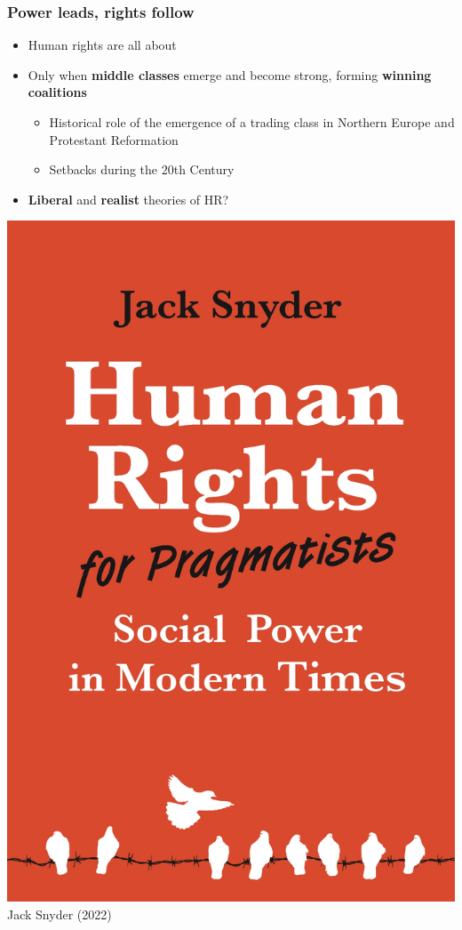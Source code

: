 \documentclass[aspectratio=43]{beamer}
\begin{document}
\begin{frame}
\frametitle{Power leads, rights follow}
\centering

\begin{minipage}{.59\textwidth}\centering

\begin{itemize}
  \item Human rights are all about 
  \item<2-> Only when \textbf{middle classes} emerge and become strong, forming \textbf{winning coalitions}
  \begin{itemize}
    \item Historical role of the emergence of a trading class in Northern Europe and Protestant Reformation
    \item Setbacks during the 20th Century
  \end{itemize}
  \item<3-> \textbf{Liberal} and \textbf{realist} theories of HR?
\end{itemize}

\end{minipage}\hfill
\begin{minipage}{.40\textwidth}\centering
\includegraphics[width = .95\textwidth]{img/snyder2022}\\Jack Snyder (2022)
\end{minipage}

\end{frame}
\end{document}
